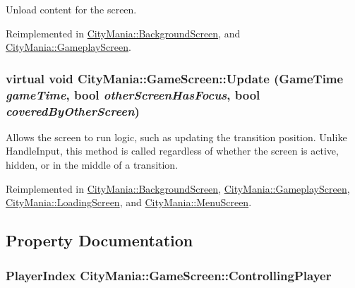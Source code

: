 Unload content for the screen. 

Reimplemented in \hyperlink{classCityMania_1_1BackgroundScreen_ac6997881fcbc2ef11ca6a4fb8d093b4b}{CityMania::BackgroundScreen}, and \hyperlink{classCityMania_1_1GameplayScreen_ad61c20401840e56538b55b6ae3704f45}{CityMania::GameplayScreen}.\hypertarget{classCityMania_1_1GameScreen_a7f0d5b33eca521dc7fcd89eec337ccf9}{
\subsubsection[{Update}]{\setlength{\rightskip}{0pt plus 5cm}virtual void CityMania::GameScreen::Update (GameTime {\em gameTime}, \/  bool {\em otherScreenHasFocus}, \/  bool {\em coveredByOtherScreen})}}
\label{classCityMania_1_1GameScreen_a7f0d5b33eca521dc7fcd89eec337ccf9}


Allows the screen to run logic, such as updating the transition position. Unlike HandleInput, this method is called regardless of whether the screen is active, hidden, or in the middle of a transition. 

Reimplemented in \hyperlink{classCityMania_1_1BackgroundScreen_aee39777b1741e0c3608b13cdcf8068c3}{CityMania::BackgroundScreen}, \hyperlink{classCityMania_1_1GameplayScreen_a721faf1bb18e20ca09310f3f5240de81}{CityMania::GameplayScreen}, \hyperlink{classCityMania_1_1LoadingScreen_a587d8f5feaeb84a674f1102dfdb723d4}{CityMania::LoadingScreen}, and \hyperlink{classCityMania_1_1MenuScreen_af5c5b89dcc99c92d99ec3e0924e7bea1}{CityMania::MenuScreen}.

\subsection{Property Documentation}
\hypertarget{classCityMania_1_1GameScreen_a71ed7a4240f030e9e0eb88d107d891b1}{
\subsubsection[{ControllingPlayer}]{\setlength{\rightskip}{0pt plus 5cm}PlayerIndex CityMania::GameScreen::ControllingPlayer}}
\label{classCityMania_1_1GameScreen_a71ed7a4240f030e9e0eb88d107d891b1}


